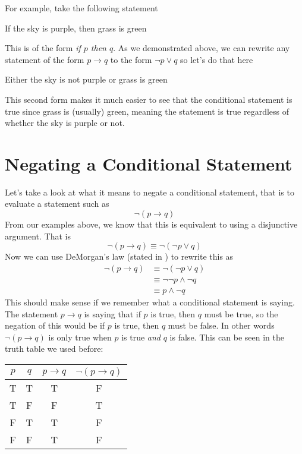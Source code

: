 For example, take the following statement\\
\begin{center}
    If the sky is purple, then grass is green
\end{center}
This is of the form \emph{if $p$ then $q$}. As we demonstrated above, we can rewrite any statement of the form $p \to q$ to the form $\lnot p \lor q$ so let's do that here
\begin{center}
    Either the sky is not purple or grass is green
\end{center}
This second form makes it much easier to see that the conditional statement is true since grass is (usually) green, meaning the statement is true regardless of whether the sky is purple or not.

\section{Negating a Conditional Statement}
\label{sec:negatingConditional}
Let's take a look at what it means to negate a conditional statement, that is to evaluate a statement such as
$$\lnot (p \to q)$$
From our examples above, we know that this is equivalent to using a disjunctive argument. That is
$$\lnot (p \to q) \equiv \lnot (\lnot p \lor q)$$
Now we can use DeMorgan's law (stated in  ) to rewrite this as
\begin{align*}
    \lnot (p \to q) & \equiv \lnot (\lnot p \lor q)                            \\
                    & \equiv \lnot \lnot p \land \lnot q \tag*{DeMorgan's Law} \\
                    & \equiv p \land \lnot q \tag*{Double Negation}
\end{align*}
This should make sense if we remember what a conditional statement is saying. The statement $p \to q$ is saying that if $p$ is true, then $q$ must be true, so the negation of this would be if $p$ is true, then $q$ must be false. In other words $\lnot (p \to q)$ is only true when $p$ is true \emph{and} $q$ is false. This can be seen in the truth table we used before:

\begin{center}
    \begin{tabular}{|c|c|c|c|}
        \hline
        $p$ & $q$ & $p \to q$ & $\lnot (p \to q)$ \\
        \hline
        T   & T   & T         & F                 \\
        \hline
        T   & F   & F         & T                 \\
        \hline
        F   & T   & T         & F                 \\
        \hline
        F   & F   & T         & F                 \\
        \hline
    \end{tabular}
\end{center}

